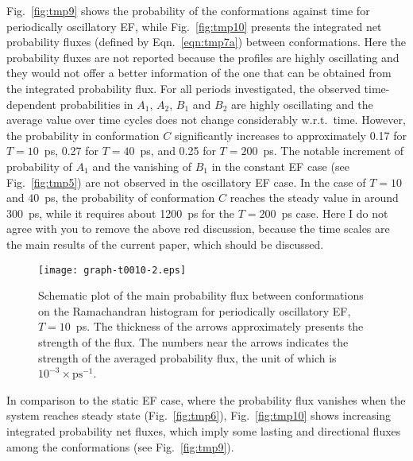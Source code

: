 \documentclass[a4paper,preprint,unsortedaddress,onecolumn]{revtex4-1}
\newcommand{\recheck}[1]{{\color{red} #1}}
\newcommand{\bluec}[1]{{\color{blue} #1}}
\begin{document}
Fig.~\ref{fig:tmp9} shows the probability of the
conformations against time for periodically oscillatory EF,
while  
Fig.~\ref{fig:tmp10} presents the integrated net probability fluxes
(defined by Eqn.~\eqref{eqn:tmp7a}) between
conformations. Here the probability fluxes are not reported
because the profiles are highly oscillating and they would not offer 
a better information of the one that can be obtained from the integrated probability flux.
For all periods investigated,
the observed time-dependent probabilities  in $A_1$, $A_2$, $B_1$ and $B_2$ are
highly oscillating and the average value over time cycles does not change
considerably w.r.t.~time.
However, the probability in conformation $C$ significantly
increases to approximately 0.17 for $T=10$~ps, 0.27 for  $T=40$~ps, and
0.25 for $T=200$~ps.
\recheck{The notable increment of probability of $A_1$ and
  the vanishing of $B_1$ in the constant EF case (see Fig.~\ref{fig:tmp5})}
are not observed in the oscillatory EF case.
\recheck{
In the case of $T=10$ and $40$~ps, \recheck{the probability of conformation $C$}
reaches the steady value in around 300~ps, while it requires about 1200~ps
for the $T=200$~ps case. } \bluec{Here I do not agree with you to remove the above red discussion, because the time scales are
the main results of the current paper, which should be discussed.}
\begin{figure}
  \centering
  \texttt{[image: graph-t0010-2.eps]}
  \caption{Schematic plot of the main probability flux between conformations
    on the Ramachandran histogram
    for periodically oscillatory EF, $T=10$~ps. The thickness 
    of the arrows approximately presents the strength of the flux.
    The numbers near the arrows indicates the strength of the averaged
    probability flux, the unit of which is $10^{-3}\times\textrm{ps}^{-1}$.
  }
  \label{fig:tmp11}
\end{figure}
\recheck{
In comparison to the static EF case, where the probability flux
vanishes when the system reaches steady state (Fig.~\ref{fig:tmp6}), 
Fig.~\ref{fig:tmp10} shows increasing
integrated probability net fluxes, which imply some lasting and directional
fluxes among the conformations (see Fig.~\ref{fig:tmp9}).
}
\end{document}
